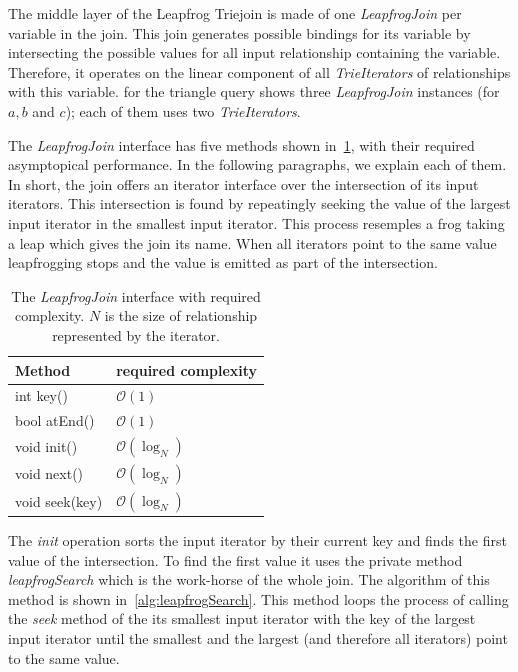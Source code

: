 The middle layer of the Leapfrog Triejoin is made of one \textit{LeapfrogJoin} per variable in the join.
This join generates possible bindings for its variable by intersecting the possible values for all input relationship containing the
variable.
Therefore, it operates on the linear component of all \textit{TrieIterators} of relationships with this variable.
 for the triangle query shows three \textit{LeapfrogJoin} instances (for $a, b$ and $c$);
each of them uses two \textit{TrieIterators}.

The \textit{LeapfrogJoin} interface has five methods shown in~\cref{table:leapfrogJoin-interface}, with their required asymptopical
performance.
In the following paragraphs, we explain each of them.
In short, the join offers an iterator interface over the intersection of its input iterators.
This intersection is found by repeatingly seeking the value of the largest input iterator in the smallest input iterator.
This process resemples a frog taking a leap which gives the join its name.
When all iterators point to the same value leapfrogging stops and the value is emitted as part of the intersection.

\begin{table}
    \centering
    \begin{tabular}{@{}ll@{}}
        \toprule
        Method         &  required complexity    \\
        \midrule
        int key()      &  $\mathcal{O}(1)$       \\
        bool atEnd()   &  $\mathcal{O}(1)$       \\
        void init()    &  $\mathcal{O}(\log_N)$  \\
        void next()    &  $\mathcal{O}(\log_N)$  \\
        void seek(key) &  $\mathcal{O}(\log_N)$  \\
        \bottomrule
    \end{tabular}
    \caption{
    The \textit{LeapfrogJoin} interface with required complexity.
    $N$ is the size of relationship represented by the iterator.
    }
    \label{table:leapfrogJoin-interface}
\end{table}


The \textit{init} operation sorts the input iterator by their current key and finds the first value of the intersection.
To find the first value it uses the private method \textit{leapfrogSearch} which is the work-horse of the whole join.
The algorithm of this method is shown in~\cref{alg:leapfrogSearch}.
This method loops the process of calling the \textit{seek} method of the its smallest input iterator with the key of the largest input
iterator until the smallest and the largest (and therefore all iterators) point to the same value.

